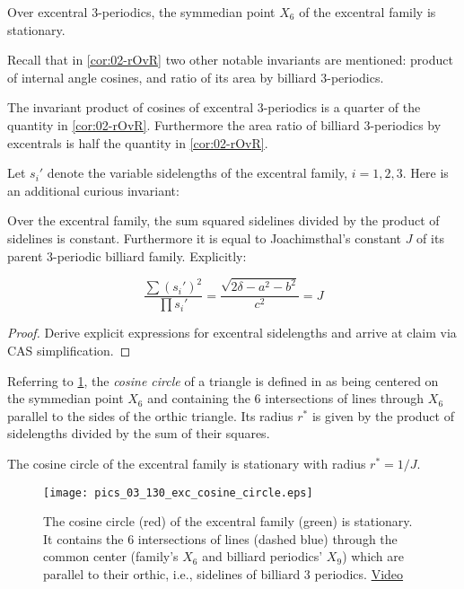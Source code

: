 \begin{corollary}
Over excentral 3-periodics, the symmedian point $X_6$ of the excentral family is stationary.
\end{corollary}

Recall that in \cref{cor:02-rOvR} two other notable invariants are mentioned: product of internal angle cosines, and ratio of its area by billiard 3-periodics.

\begin{corollary}
The invariant product of cosines of excentral 3-periodics is a quarter of the quantity in \cref{cor:02-rOvR}. Furthermore the area ratio of billiard 3-periodics by excentrals is half the quantity in \cref{cor:02-rOvR}.
\end{corollary}

Let $s_i'$ denote the variable sidelengths of the excentral family, $i=1,2,3$. Here is an additional curious invariant:

\begin{proposition}
Over the excentral family, the sum squared sidelines divided by the product of sidelines is constant. Furthermore it is equal to Joachimsthal's constant $J$ of its parent 3-periodic billiard family. Explicitly:

\[ \frac{\sum{(s_i')^2}}{\prod{s_i'}}=\frac{\sqrt{2\delta-a^2-b^2}}{c^2}={J} \]
\end{proposition}

\begin{proof}
Derive explicit expressions for excentral sidelengths and arrive at claim via CAS simplification.
\end{proof}

Referring to \cref{fig:03-cos-circle}, the {\em cosine circle} of a triangle is defined in \cite[Cosine Circle]{mw} as being centered on the symmedian point $X_6$ and containing the 6 intersections of lines through $X_6$ parallel to the sides of the orthic triangle. Its radius $r^*$ is given by the product of sidelengths divided by the sum of their squares.

\begin{corollary}
The cosine circle of the excentral family is stationary with radius $r^*=1/J$.
\end{corollary}

\begin{figure}
    \centering
    \texttt{[image: pics\_03\_130\_exc\_cosine\_circle.eps]}
    \caption{The cosine circle (red) of the excentral family (green) is stationary. It contains the 6 intersections of lines (dashed blue) through the common center (family's $X_6$ and billiard periodics' $X_9$) which are parallel to their orthic, i.e., sidelines of billiard 3 periodics. \href{https://youtu.be/CrOSI8d8qDc}{Video}}
    \label{fig:03-cos-circle}
\end{figure}

